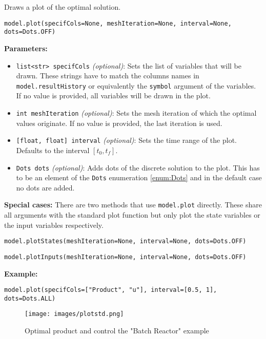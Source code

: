 \documentclass[12pt]{article}
\begin{document}
\begin{mdframed}[backgroundcolor=gray!10, roundcorner=10pt,
		linewidth=1pt]

	Draws a plot of the optimal solution.

	\begin{lstlisting}
model.plot(specifCols=None, meshIteration=None, interval=None, dots=Dots.OFF) 
		\end{lstlisting}
	\label{plot}
	\textbf{Parameters:}
	\begin{itemize}
		\item \texttt{list<str> specifCols} \emph{(optional)}: Sets the
		      list of variables that will be drawn. These strings have to match the columns
		      names in \texttt{model.resultHistory} or equivalently the \texttt{symbol}
		      argument of the variables. If no value is provided, all variables will be drawn
		      in the plot.

		\item \texttt{int meshIteration} \emph{(optional)}: Sets the
		      mesh iteration of which the optimal values originate. If no value is provided,
		      the last iteration is used.

		\item \texttt{[float, float] interval} \emph{(optional)}: Sets
		      the time range of the plot. Defaults to the interval $[t_0, t_f]$.

		\item \texttt{Dots dots} \emph{(optional)}: Adds dots of the
		      discrete solution to the plot. This has to be an element of the \texttt{Dots}
		      enumeration \eqref{enum:Dots} and in the default case no dots are added.
	\end{itemize}

	\textbf{Special cases:}
	There are two methods that use \texttt{model.plot} directly.
	These share all arguments with the standard plot function but only plot the
	state variables or the input variables respectively.
	\begin{lstlisting}
model.plotStates(meshIteration=None, interval=None, dots=Dots.OFF)     
		\end{lstlisting}

	\begin{lstlisting}
model.plotInputs(meshIteration=None, interval=None, dots=Dots.OFF)     
		\end{lstlisting}

	\textbf{Example:}	\begin{lstlisting}
model.plot(specifCols=["Product", "u"], interval=[0.5, 1], dots=Dots.ALL)
					\end{lstlisting}
	\begin{figure}[H]
		\centering
		\texttt{[image: images/plotstd.png]}
		\caption{Optimal product and control the "Batch Reactor" example}
		\label{fig:batch}
	\end{figure}

\end{mdframed}
\end{document}
